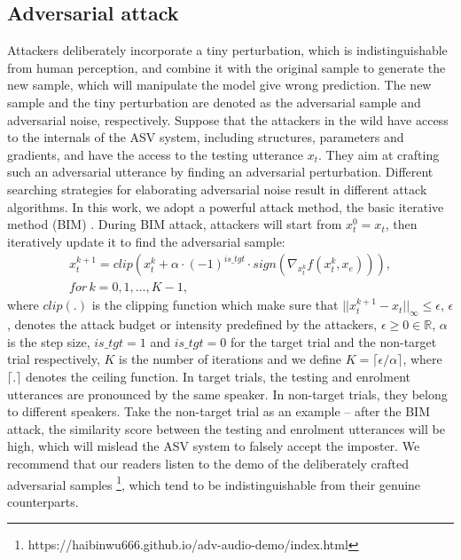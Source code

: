 \subsection{Adversarial attack}
Attackers deliberately incorporate a tiny perturbation, which is indistinguishable from human perception, and combine it with the original sample to generate the new sample, which will manipulate the model give wrong prediction.
The new sample and the tiny perturbation are denoted as the adversarial sample and adversarial noise, respectively.
Suppose that the attackers in the wild have access to the internals of the ASV system, including structures, parameters and gradients, and have the access to the testing utterance $x_{t}$.
They aim at crafting such an adversarial utterance by finding an adversarial perturbation.
Different searching strategies for elaborating adversarial noise result in different attack algorithms.
In this work, we adopt a powerful attack method, the basic iterative method (BIM) \cite{kurakin2016adversarial}.
During BIM attack, attackers will start from $x_{t}^{0}=x_{t}$, then iteratively update it to find the adversarial sample:
\begin{equation}
\begin{aligned}
    x_{t}^{k+1}=clip\left(x_{t}^{k} + \alpha \cdot (-1)^{is\_tgt} \cdot sign\left(\nabla_{x_{t}^{k}}f(x_{t}^{k}, x_{e}) \right)\right), 
    \\ for \, k=0,1, \ldots, K-1,
\end{aligned}
\end{equation}
where $clip(.)$ is the clipping function which make sure that $||x_{t}^{k+1} - x_{t}||_{\infty}\leq \epsilon$,
$\epsilon$, denotes the attack budget or intensity predefined by the attackers,
$\epsilon \geq 0 \in \mathbb{R}$,
$\alpha$ is the step size,
$is\_tgt=1$ and $is\_tgt=0$ for the target trial and the non-target trial respectively,
$K$ is the number of iterations and we define $K = \lceil \epsilon / \alpha \rceil$, where $\lceil.\rceil$ denotes the ceiling function.
In target trials, the testing and enrolment utterances are pronounced by the same speaker.  In non-target trials, they belong to different speakers.
Take the non-target trial as an example -- after the BIM attack, the similarity score between the testing and enrolment utterances will be high, which will mislead the ASV system to falsely accept the imposter.
We recommend that our readers listen to the demo of the deliberately crafted adversarial samples \footnote[2]{https://haibinwu666.github.io/adv-audio-demo/index.html}, which tend to be indistinguishable from their genuine counterparts.

